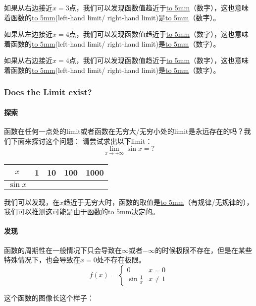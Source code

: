 \documentclass[UTF8]{ctexart}
\begin{document}
如果从右边接近$x = 3$点，我们可以发现函数值趋近于\underline{\hbox to 5mm{}}（数字），这也意味着函数的\underline{\hbox to 5mm{}}(left-hand limit/ right-hand limit)是\underline{\hbox to 5mm{}}（数字）。

如果从左边接近$x = 4$点，我们可以发现函数值趋近于\underline{\hbox to 5mm{}}（数字），这也意味着函数的\underline{\hbox to 5mm{}}(left-hand limit/ right-hand limit)是\underline{\hbox to 5mm{}}（数字）。

如果从右边接近$x = 4$点，我们可以发现函数值趋近于\underline{\hbox to 5mm{}}（数字），这也意味着函数的\underline{\hbox to 5mm{}}(left-hand limit/ right-hand limit)是\underline{\hbox to 5mm{}}（数字）。

\subsubsection{Does the Limit exist?}
\paragraph{探索}
函数在任何一点处的limit或者函数在无穷大/无穷小处的limit是永远存在的吗？我们下面来探讨这个问题：
请尝试求出以下limit：
\[{\lim_{x\to +\infty }} \sin{x} = ?\]

\begin{center}
\begin{tabular}{c|c|c|c|c}
\hline
$x$  & 1 & 10 &100& 1000 \\
\hline
$\sin{x}$ & &  &  & \\
\hline
\end{tabular}
\end{center}
我们可以发现，在$x$趋近于无穷大时，函数的取值是\underline{\hbox to 5mm{}}（有规律/无规律的），我们可以推测这可能是由于函数的\underline{\hbox to 5mm{}}决定的。

\paragraph{发现}
函数的周期性在一般情况下只会导致在$\infty$或者$-\infty$的时候极限不存在，但是在某些特殊情况下，也会导致在$x = 0$处不存在极限。
\[f(x) = 
\begin{cases}
0 & x = 0\\
\sin{\frac{1}{x}} & x\not=1
\end{cases}
\]

这个函数的图像长这个样子：
\begin{center}
\end{center}
\end{document}
